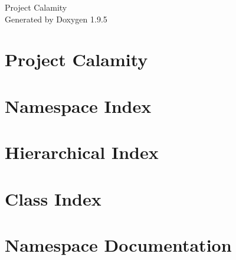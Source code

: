 \documentclass[twoside]{book}
\newcommand{\+}{\discretionary{\mbox{\scriptsize$\hookleftarrow$}}{}{}}
\newcommand{\clearemptydoublepage}{%
    \newpage{\pagestyle{empty}\cleardoublepage}%
  }
\begin{document}
  \raggedbottom
    \hypersetup{pageanchor=false,
                bookmarksnumbered=true,
                pdfencoding=unicode
               }
  \begin{titlepage}
  \vspace*{7cm}
  \begin{center}%
  {\Large Project Calamity}\\
  \vspace*{1cm}
  {\large Generated by Doxygen 1.9.5}\\
  \end{center}
  \end{titlepage}
  \clearemptydoublepage
  \tableofcontents
  \clearemptydoublepage
  \hypersetup{pageanchor=true}
\chapter{Project Calamity}
\label{index}\hypertarget{index}{}
\chapter{Namespace Index}

\chapter{Hierarchical Index}

\chapter{Class Index}

\chapter{Namespace Documentation}







\end{document}
